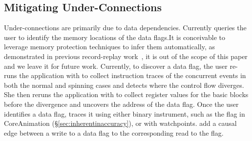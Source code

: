 \subsection{Mitigating Under-Connections}\label{subsec:fix-under}

Under-connections are primarily due to data dependencies.  Currently \xxx
queries the user to identify the memory locations of the data flags.It
is conceivable to leverage memory protection techniques to infer them
automatically, as demonstrated in previous record-replay
work~\cite{xxx}, it is out of the scope of this paper and we leave it for
future work.  Currently, to discover a data flag, the user re-runs the
application with \xxx to collect instruction traces of the concurrent
events in both the normal and spinning cases and detects where the control
flow diverges. She then reruns the application with \xxx to collect
register values for the basic blocks before the divergence and uncovers
the address of the data flag.  Once the user identifies a data flag, \xxx
traces it using either binary instrument, such as the 
flag in CoreAnimation (\S\ref{sec:inherentinaccuracy}), or with
watchpoints.  \xxx add a causal edge between a write to a data flag to the
corresponding read to the flag.















